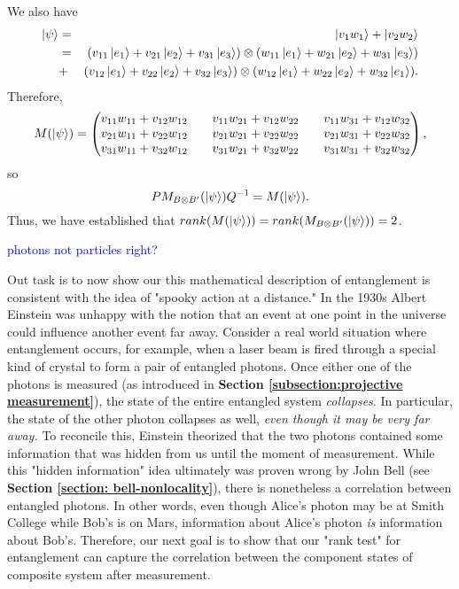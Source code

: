 \begin{example}

We also have
\begin{eqnarray*}
\ket{\psi}&=&\ket{v_1 w_1}+\ket{v_2 w_2}\\
&=& (v_{11}\ket{e_1}+v_{21}\ket{e_2}+v_{31}\ket{e_3}) \otimes (w_{11}\ket{e_1}+w_{21}\ket{e_2}+w_{31}\ket{e_3}) \\
&+& (v_{12}\ket{e_1}+v_{22}\ket{e_2}+v_{32}\ket{e_3}) \otimes (w_{12}\ket{e_1}+w_{22}\ket{e_2}+w_{32}\ket{e_1}).
\end{eqnarray*}
Therefore,
\begin{equation}
M(\ket{\psi})=
\begin{pmatrix}
v_{11}w_{11}+v_{12}w_{12} && v_{11}w_{21}+v_{12}w_{22} && v_{11}w_{31}+v_{12}w_{32}\\
v_{21}w_{11}+v_{22}w_{12} && v_{21}w_{21}+v_{22}w_{22} && v_{21}w_{31}+v_{22}w_{32} \\
v_{31}w_{11}+v_{32}w_{12} && v_{31}w_{21}+v_{32}w_{22} && v_{31}w_{31}+v_{32}w_{32} 
\end{pmatrix},
\end{equation}
so 
$$PM_{B \otimes B'}(\ket{\psi})Q^{-1}=M(\ket{\psi}).$$
Thus, we have established that $rank(M(\ket{\psi}))=rank(M_{B \otimes B'}(\ket{\psi}))=2$.
\end{example}

\textcolor{blue}{photons not particles right?}

Out task is to now show our this mathematical description of entanglement is consistent with the idea of "spooky action at a distance." In the 1930s Albert Einstein was unhappy with the notion that an event at one point in the universe could influence another event far away. Consider a real world situation where entanglement occurs, for example, when a laser beam is fired through a special kind of crystal to form a pair of entangled photons. Once either one of the photons is measured (as introduced in \textbf{Section \ref{subsection:projective measurement}}), the state of the entire entangled system {\emph{collapses}}.  In particular, the state of the other photon collapses as well, {\emph{even though it may be very far away.}} To reconcile this, Einstein theorized that the two photons contained some information that was hidden from us until the moment of measurement. While this "hidden information" idea ultimately was proven wrong by John Bell (see \textbf{Section \ref{section: bell-nonlocality}}), there is nonetheless a correlation between entangled photons. In other words, even though Alice's photon may be at Smith College while Bob's is on Mars, information about Alice's photon {\emph{is}} information about Bob's. Therefore, our next goal is to show that our "rank test" for entanglement can capture the correlation between the component states of composite system after measurement.

